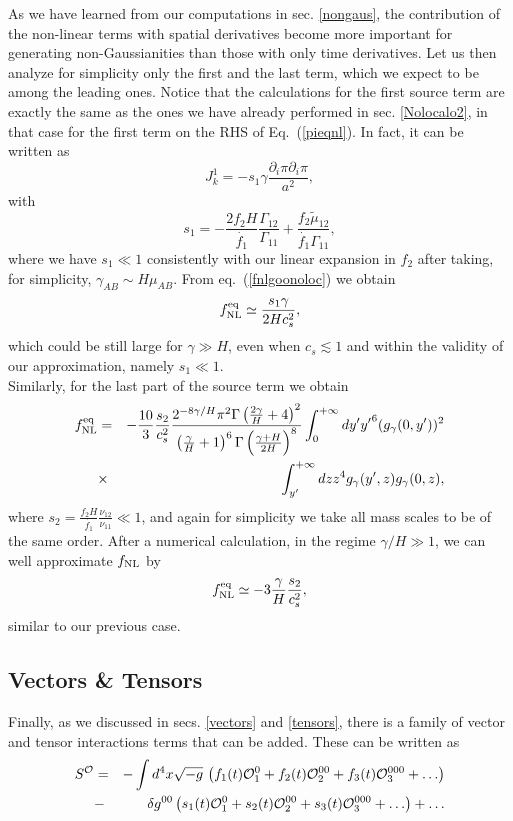 \documentclass[11pt,amsmath,floats,floatfix,nofootinbib,secnumarabic, superscriptaddress, tightenlines]{revtex4}
\newcommand{\beq}{\begin{equation}}
\newcommand{\eeq}{\end{equation}}
\newcommand{\be}{\begin{equation}}
\newcommand{\ee}{\end{equation}}
\newcommand{\lp}{\left(}
\newcommand{\rp}{\right)}
\newcommand{\calo}{{\cal O}}
\begin{document}
{As we have learned from our computations in sec. \ref{nongaus}, the contribution of the non-linear terms with spatial derivatives become more important for generating non-Gaussianities than those with only time derivatives. Let us then analyze for simplicity only the first and the last term, which we expect to be among the leading ones.  Notice that the calculations for the first source term are exactly the same as the ones we have already performed in sec. \ref{Nolocalo2}, in that case for the first term on the RHS of Eq.~(\ref{pieqnl}). In fact, it can be written as
\be J_k^1=-s_1\gamma\frac{\partial_i\pi\partial_i{\pi}}{a^2},\ee
with
\be
s_1=-\frac{2f_2 H}{\dot{f_1}}\frac{\Gamma_{12}}{\Gamma_{11}} +\frac{f_2\tilde{\mu}_{12}} {\dot{f_1}\Gamma_{11}}, \ee
where we have $s_1\ll 1$ consistently with our linear expansion in $f_2$ after taking, for simplicity, $\gamma_{AB}\sim H \mu_{AB}$. From eq.~(\ref{fnlgoonoloc}) we obtain
\beq f_{\rm NL}^{\rm eq}\simeq\frac{s_1\gamma}{2H c_s^2},\eeq
which could be still large for $\gamma\gg H$, even when $c_s\lesssim 1$ and within the validity of our approximation, namely  $s_1 \ll 1$.\\

Similarly, for the last part of the source term we obtain
\begin{eqnarray}
f_{\rm NL}^{\rm eq}&=&-\frac{10}{3}\frac{s_2}{c_s^2}\frac{2^{-8\gamma/H}\pi^2 {\Gamma\left(\frac{2\gamma}{H}+4\right)}^2}{\lp\frac{\gamma}{H}+1\rp^6{\Gamma\lp\frac{\gamma+H}{2 H}\rp}^8}
 \int_{0}^{+\infty} dy' {y'}^6 (g_{\gamma}(0, y'))^2\nonumber\\&\times&\int_{y'}^{+\infty} dz z^4  g_{\gamma}( y',z)g_{\gamma}(0, z),\label{fnlmix2n}
\end{eqnarray}
where $s_2=\frac{f_2H}{\dot{f_1}}\frac{\nu_{12}}{\nu_{11}}\ll 1$, and again for simplicity we take all mass scales to be of the same order. After a numerical calculation, in the regime $\gamma/H\gg 1$, we can well approximate $f_{\rm NL}$ by
\beq
f_{\rm NL}^{\rm eq}\simeq- 3\frac{\gamma}{H} \frac{s_2}{ c_s^2},
\eeq
similar to our previous case. 

\subsection{Vectors \& Tensors}\label{vectens}

Finally, as we discussed in secs. \ref{vectors} and \ref{tensors},  there is a family of vector and tensor interactions terms that can be added. These can be written as
\begin{eqnarray}\label{family}
S^{\calo}&=&-\int d^4 x \sqrt{-g}\,\left(f_1(t)\calo^{0}_1+f_2(t)\calo^{00}_2+f_3(t)\calo^{000}_3+\ldots\right) \\
&-&\delta g^{00}\left(s_1(t)\calo^{0}_1+s_2(t)\calo^{00}_2+s_3(t)\calo^{000}_3+\ldots\right)+\ldots\nonumber
\end{eqnarray}

}
\end{document}
